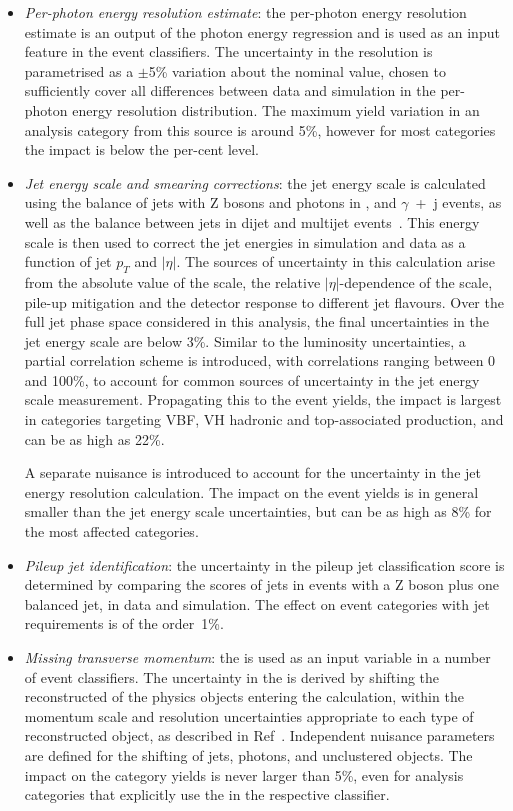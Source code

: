\begin{itemize}
    \item \textit{Per-photon energy resolution estimate}: the per-photon energy resolution estimate is an output of the photon energy regression and is used as an input feature in the event classifiers. The uncertainty in the resolution is parametrised as a $\pm$5\% variation about the nominal value, chosen to sufficiently cover all differences between data and simulation in the per-photon energy resolution distribution. The maximum yield variation in an analysis category from this source is around 5\%, however for most categories the impact is below the per-cent level. 
    
    \item \textit{Jet energy scale and smearing corrections}: the jet energy scale is calculated using the \pt balance of jets with Z bosons and photons in \Zee, \Zmumu and $\gamma$~+~j events, as well as the \pt balance between jets in dijet and multijet events~\cite{Khachatryan:2016kdb}. This energy scale is then used to correct the jet energies in simulation and data as a function of jet $p_T$ and $|\eta|$. The sources of uncertainty in this calculation arise from the absolute value of the scale, the relative $|\eta|$-dependence of the scale, pile-up mitigation and the detector response to different jet flavours. Over the full jet phase space considered in this analysis, the final uncertainties in the jet energy scale are below 3\%. Similar to the luminosity uncertainties, a partial correlation scheme is introduced, with correlations ranging between 0 and 100\%, to account for common sources of uncertainty in the jet energy scale measurement. Propagating this to the event yields, the impact is largest in categories targeting VBF, VH hadronic and top-associated production, and can be as high as 22\%.
    
    \noindent
    A separate nuisance is introduced to account for the uncertainty in the jet energy resolution calculation. The impact on the event yields is in general smaller than the jet energy scale uncertainties, but can be as high as 8\% for the most affected categories.

    \item \textit{Pileup jet identification}: the uncertainty in the pileup jet classification score is determined by comparing the scores of jets in events with a Z boson plus one balanced jet, in data and simulation. The effect on event categories with jet requirements is of the order~1\%.
    
    \item \textit{Missing transverse momentum}: the \met is used as an input variable in a number of event classifiers. The uncertainty in the \met is derived by shifting the reconstructed \pt of the physics objects entering the \met calculation, within the momentum scale and resolution uncertainties appropriate to each type of reconstructed object, as described in Ref~\cite{CMS-PAS-JME-16-003}. Independent nuisance parameters are defined for the \pt shifting of jets, photons, and unclustered objects. The impact on the category yields is never larger than 5\%, even for analysis categories that explicitly use the \met in the respective classifier.
    

\end{itemize}
